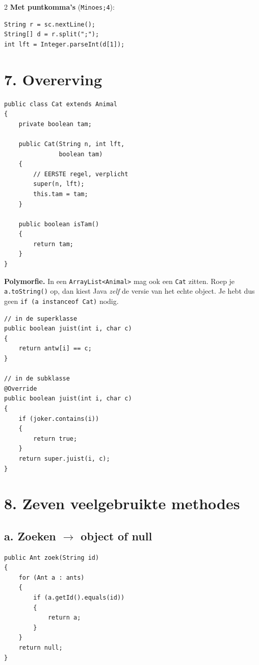 \documentclass[12pt,a4paper]{extarticle}
\begin{document}
\begin{multicols}{2}
    \textbf{Met puntkomma's} (\texttt{Minoes;4}):
    \begin{lstlisting}
String r = sc.nextLine();
String[] d = r.split(";");
int lft = Integer.parseInt(d[1]);
\end{lstlisting}

    \section{7. Overerving}
    \begin{lstlisting}
public class Cat extends Animal
{
    private boolean tam;

    public Cat(String n, int lft,
               boolean tam)
    {
        // EERSTE regel, verplicht
        super(n, lft);
        this.tam = tam;
    }

    public boolean isTam()
    {
        return tam;
    }
}
\end{lstlisting}

    \textbf{Polymorfie.} In een \texttt{ArrayList<Animal>} mag ook een \texttt{Cat}
    zitten. Roep je \texttt{a.toString()} op, dan kiest Java \emph{zelf} de versie van
    het echte object. Je hebt dus geen \texttt{if (a instanceof Cat)} nodig.

    \begin{lstlisting}
// in de superklasse
public boolean juist(int i, char c)
{
    return antw[i] == c;
}

// in de subklasse
@Override
public boolean juist(int i, char c)
{
    if (joker.contains(i))
    {
        return true;
    }
    return super.juist(i, c);
}
\end{lstlisting}

    \section{8. Zeven veelgebruikte methodes}

    \subsection{a. Zoeken $\rightarrow$ object of null}
    \begin{lstlisting}
public Ant zoek(String id)
{
    for (Ant a : ants)
    {
        if (a.getId().equals(id))
        {
            return a;
        }
    }
    return null;
}
\end{lstlisting}


\end{multicols}
\end{document}
